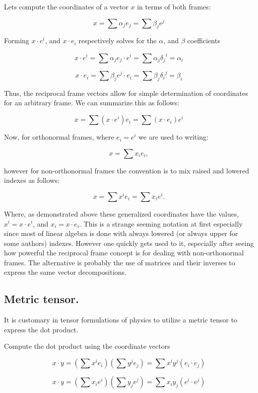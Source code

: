 Lets compute the coordinates of a vector $x$ in terms of both frames:

\[
x = \sum \alpha_j e_j = \sum \beta_j e^j
\]

Forming $x \cdot e^i$, and $x \cdot e_i$ respectively solves for the $\alpha$, and $\beta$ coefficients

\[
x \cdot e^i = \sum \alpha_j e_j \cdot e^i = \sum \alpha_j {\delta_j}^i = \alpha_i
\]

\[
x \cdot e_i = \sum \beta_j e^j \cdot e_i = \sum \beta_j {\delta_i}^j = \beta_i
\]

Thus, the reciprocal frame vectors allow for simple determination of coordinates for an arbitrary frame. We can summarize this as follows:

\[
x = \sum ( x \cdot e^i ) e_i = \sum ( x \cdot e_i ) e^i
\]

Now, for orthonormal frames, where $e_i = e^i$ we are used to writing:

\[
x = \sum x_i e_i,
\]

however for non-orthonormal frames the convention is to mix raised and lowered indexes as follows:

\[
x = \sum x^i e_i = \sum x_i e^i.
\]

Where, as demonstrated above these generalized coordinates have the values, $x^i = x \cdot e^i$, and $x_i = x \cdot e_i$.  This is a strange seeming notation at
first especially since most of linear algebra is done with always lowered (or always upper for some authors) indexes.  However one quickly gets used to it, especially after seeing how powerful the reciprocal frame concept is for dealing with non-orthonormal frames.  The alternative is probably the use of matrices and their inverses to express the same vector decompositions.

\subsection{Metric tensor. }

It is customary in tensor formulations of physics to utilize a metric tensor to express the dot product.

Compute the dot product using the coordinate vectors

\[
x \cdot y = \left(\sum x^i e_i \right)\left(\sum y^j e_j \right) = \sum x^i y^j \left( e_i \cdot e_j \right)
\]

\[
x \cdot y = \left(\sum x_i e^i \right)\left(\sum y_j e^j \right) = \sum x_i y_j \left( e^i \cdot e^j \right)
\]

